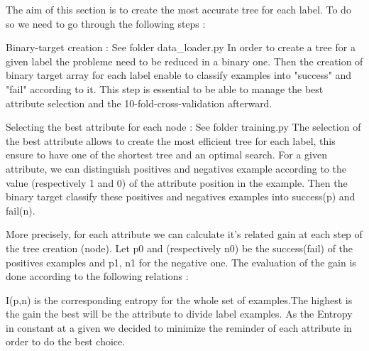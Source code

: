 The aim of this section is to create the most accurate tree for each label. To do so we need to go through the following steps : 

Binary-target creation : 
See folder data\_loader.py
In order to create a tree for a given label the probleme need to be reduced in a binary one. Then the creation of binary target array for each label enable to classify examples into "success" and "fail" according to it. This step is essential to be able to manage the best attribute selection and the 10-fold-cross-validation afterward.


Selecting the best attribute for each node : 
See folder training.py
The selection of the best attribute allows to create the most efficient tree for each label, this ensure to have one of the shortest tree and an optimal search. For a given attribute, we can distinguish positives and negatives example according to the value (respectively 1 and 0) of the attribute position in the example. Then the binary target classify these positives and negatives examples into success(p) and fail(n). 

More precisely, for each attribute we can calculate it's related gain at each step of the tree creation (node). Let p0 and (respectively n0) be the success(fail) of the positives examples and p1, n1 for the negative one. The evaluation of the gain is done according to the following relations : 

I(p,n) is the corresponding entropy for the whole set of examples.The highest is the gain the best will be the attribute to divide label examples. As the Entropy in constant at a given  we decided to minimize the reminder of each attribute in order to do the best choice. 
